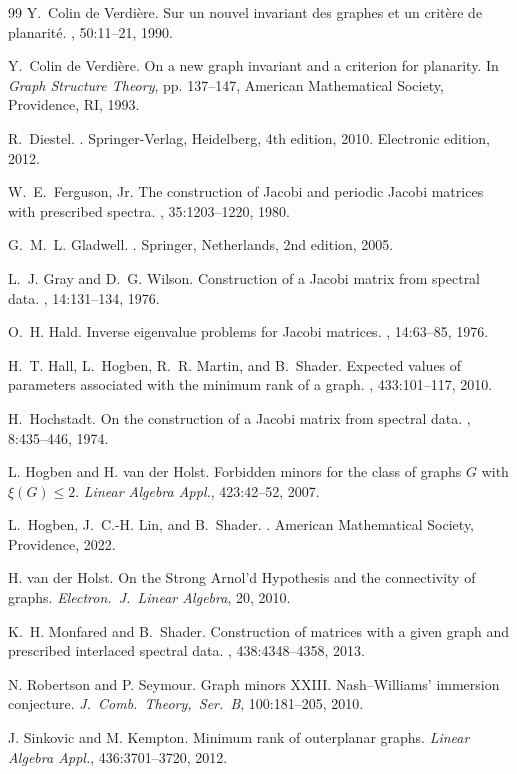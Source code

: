 \documentclass{article}
\theoremstyle{definition}
\begin{document}
\begin{thebibliography}{99}
Y.~Colin de Verdi\`ere.
\newblock Sur un nouvel invariant des graphes et un crit\`ere de planarit\'e.
, 50:11--21, 1990.

Y.~Colin de Verdi\`ere.
\newblock On a new graph invariant and a criterion for planarity.
\newblock In {\em Graph Structure Theory}, pp. 137--147, American Mathematical Society, Providence, RI, 1993.

R.~Diestel.
.
\newblock Springer-Verlag, Heidelberg, 4th edition, 2010.
\newblock Electronic edition, 2012.

W.~E.~Ferguson, Jr.
\newblock The construction of {J}acobi and periodic {J}acobi matrices with prescribed spectra.
, 35:1203--1220, 1980.

G.~M.~L. Gladwell.
.
\newblock Springer, Netherlands, 2nd edition, 2005.

L.~J. Gray and D.~G. Wilson.
\newblock Construction of a {J}acobi matrix from spectral data.
, 14:131--134, 1976.

O.~H. Hald.
\newblock Inverse eigenvalue problems for {J}acobi matrices.
, 14:63--85, 1976.

H.~T. Hall, L.~Hogben, R.~R. Martin, and B.~Shader.
\newblock Expected values of parameters associated with the minimum rank of a graph.
, 433:101--117, 2010.

H.~Hochstadt.
\newblock On the construction of a {J}acobi matrix from spectral data.
, 8:435--446, 1974.

L. Hogben and H. van der Holst.
\newblock Forbidden minors for the class of graphs $G$ with $\xi(G) \leq 2$.
\newblock \emph{Linear Algebra Appl.}, 423:42--52, 2007.

L.~Hogben, J.~C.-H. Lin, and B.~Shader.
.
\newblock American Mathematical Society, Providence, 2022.

H. van der Holst. 
\newblock On the Strong Arnol'd Hypothesis and the connectivity of graphs. 
\newblock \emph{Electron.\ J.\ Linear Algebra}, 20, 2010.

K.~H. Monfared and B.~Shader.
\newblock Construction of matrices with a given graph and prescribed interlaced spectral data.
, 438:4348--4358, 2013.

N. Robertson and P. Seymour. 
\newblock Graph minors XXIII. 
\newblock Nash--Williams' immersion conjecture. 
\newblock \emph{J.\ Comb.\ Theory,\ Ser.~B}, 100:181--205, 2010.

J. Sinkovic and M. Kempton.
\newblock Minimum rank of outerplanar graphs.
\newblock \emph{Linear Algebra Appl.}, 436:3701--3720, 2012.

\end{thebibliography}
\end{document}
